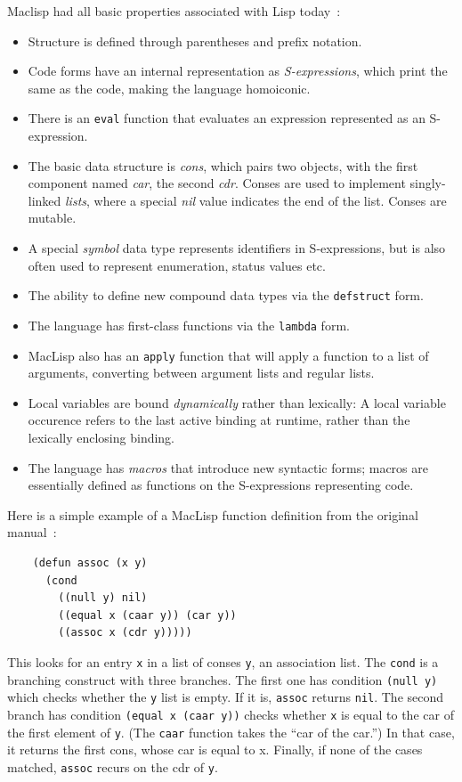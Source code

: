 \documentclass[format=acmsmall, review]{acmart}
\begin{document}
Maclisp had all basic properties associated with Lisp today~\cite{Moon1974}:
%
\begin{itemize}
\item Structure is defined through parentheses and prefix notation.
\item Code forms have an internal representation as
  \textit{S-expressions}, which print the same as the code, making the
  language homoiconic.
\item There is an \texttt{eval} function that evaluates an expression
  represented as an S-expression.
\item The basic data structure is \textit{cons}, which pairs two
  objects, with the first component named \textit{car}, the second
  \textit{cdr}.  Conses are used to implement singly-linked
  \textit{lists}, where a special \textit{nil} value indicates the end
  of the list.  Conses are mutable.
\item A special \textit{symbol} data type represents identifiers in
  S-expressions, but is also often used to represent enumeration,
  status values etc.
\item The ability to define new compound data types via the
  \texttt{defstruct} form.
\item The language has first-class functions via the \texttt{lambda}
  form.
\item MacLisp also has an \texttt{apply} function that will apply a
  function to a list of arguments, converting between argument lists
  and regular lists.
\item Local variables are bound \textit{dynamically} rather than
  lexically: A local variable occurence refers to the last active
  binding at runtime, rather than the lexically enclosing binding.
\item The language has \textit{macros} that introduce new syntactic
  forms; macros are essentially defined as functions on the S-expressions
  representing code.
\end{itemize}
%
Here is a simple example of a MacLisp function definition from the
original manual~\cite{Moon1974}:
%
\begin{verbatim}
    (defun assoc (x y)
      (cond
        ((null y) nil)
        ((equal x (caar y)) (car y))
        ((assoc x (cdr y)))))
\end{verbatim}
%
This looks for an entry \texttt{x} in a list of conses \texttt{y}, an
association list.  The \texttt{cond} is a branching construct with
three branches.  The first one has condition \texttt{(null y)} which
checks whether the \texttt{y} list is empty.  If it is, \texttt{assoc}
returns \texttt{nil}.  The second branch has condition \texttt{(equal
  x (caar y))} checks whether \texttt{x} is equal to the car of the
first element of \texttt{y}.  (The \texttt{caar} function takes the
``car of the car.'')  In that case, it returns the first cons, whose
car is equal to x.  Finally, if none of the cases matched,
\texttt{assoc} recurs on the cdr of \texttt{y}.
\end{document}

